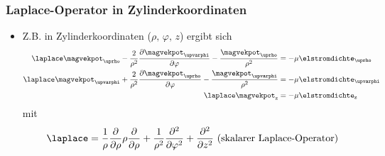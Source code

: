 \begin{frame}
  \frametitle{Laplace-Operator in Zylinderkoordinaten}
  \begin{itemize}[<+->]
  \item Z.B. in Zylinderkoordinaten (\(\rho,\,\varphi,\,z \)) ergibt sich 
\begin{align*}
	\laplace \magvekpot_{\uprho} - \dfrac{2}{\rho^2} \dfrac{\partial \magvekpot_{\upvarphi}}{\partial \varphi} - \dfrac{\magvekpot_{\uprho}}{\rho^2} &= -\mu \elstromdichte_{\uprho} \\
	\laplace \magvekpot_{\upvarphi} + \dfrac{2}{\rho^2}  \dfrac{\partial \magvekpot_{\uprho}}{\partial \varphi} - \dfrac{\magvekpot_{\upvarphi}}{\rho^2} &= -\mu \elstromdichte_{\upvarphi} \\
	\laplace \magvekpot_\mathrm{z} &= -\mu  \elstromdichte_\mathrm{z}
\end{align*}
mit
\begin{equation*}
	\laplace = \dfrac{1}{\rho} \dfrac{\partial}{\partial \rho} \rho \dfrac{\partial}{\partial \rho} + \dfrac{1}{\rho^2} \dfrac{\partial^2}{\partial \varphi^2} + \dfrac{\partial^2}{\partial z^2} \text{ (skalarer Laplace-Operator)}
\end{equation*}
  \end{itemize}
\end{frame}

